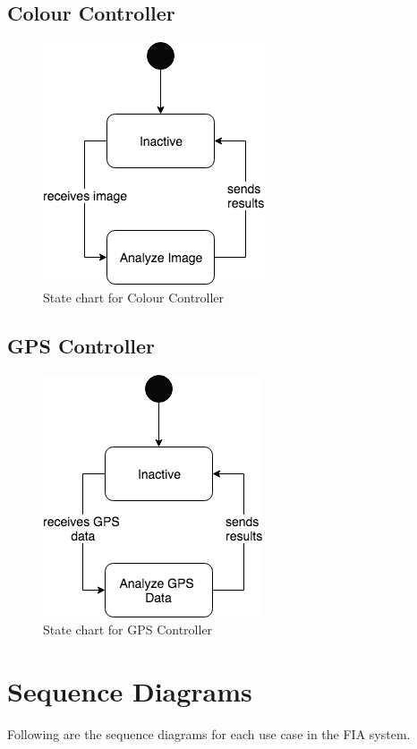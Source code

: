 \documentclass[12pt,fleqn]{article}
\begin{document}
\subsection{Colour Controller}
\begin{figure}[H]
    \centering
    \includegraphics[scale=0.5]{img/Colour_Controller.png}
    \caption{State chart for Colour Controller}
\end{figure}

\subsection{GPS Controller}
\begin{figure}[H]
    \centering
    \includegraphics[scale=0.6]{img/GPS_Controller.png}
    \caption{State chart for GPS Controller}
\end{figure}

\newpage
\section{Sequence Diagrams}
Following are the sequence diagrams for each use case in the FIA system.
\end{document}
